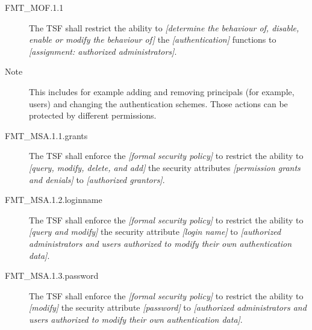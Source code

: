\documentclass[12pt,english]{scrbook}
\begin{document}
\begin{description}
\item[FMT{\_}MOF.1.1]

The TSF shall restrict the ability to \emph{{[}determine the
behaviour of, disable, enable or modify the behaviour of]} the
\emph{{[}authentication]} functions to \emph{{[}assignment: 
authorized administrators]}.

\item[Note]

This includes for example adding and removing principals (for example,
users) and changing the authentication schemes. Those actions can be
protected by different permissions.

\end{description}






\begin{description}
\item[FMT{\_}MSA.1.1.grants]
    The TSF shall enforce the \emph{{[}formal security policy]} to restrict the
    ability to \emph{{[}query, modify, delete, and add]} the security
    attributes \emph{{[}permission grants and denials]} to \emph{{[}authorized
    grantors]}.

\item[FMT{\_}MSA.1.2.loginname]
    The TSF shall enforce the \emph{{[}formal security policy]} to restrict the
    ability to \emph{{[}query and modify]} the security attribute
    \emph{{[}login name]} to \emph{{[}authorized administrators and users
    authorized to modify their own authentication data]}.

\item[FMT{\_}MSA.1.3.password]
    The TSF shall enforce the \emph{{[}formal security policy]} to restrict
    the ability to \emph{{[}modify]} the security attribute
    \emph{{[}password]} to \emph{{[}authorized administrators and users authorized to
    modify their own authentication data]}.

\end{description}

\end{document}
